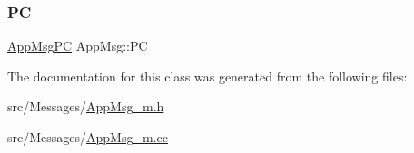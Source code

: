 \subsubsection{\texorpdfstring{PC}{PC}}
{\footnotesize\ttfamily \hyperlink{AppMsg__m_8h_abcd76636e4b750d033ffc348601dd7a2}{App\+Msg\+PC} App\+Msg\+::\+PC\hspace{0.3cm}{\ttfamily [protected]}}



The documentation for this class was generated from the following files\+:\begin{DoxyCompactItemize}
\item 
src/\+Messages/\hyperlink{AppMsg__m_8h}{App\+Msg\+\_\+m.\+h}\item 
src/\+Messages/\hyperlink{AppMsg__m_8cc}{App\+Msg\+\_\+m.\+cc}\end{DoxyCompactItemize}
